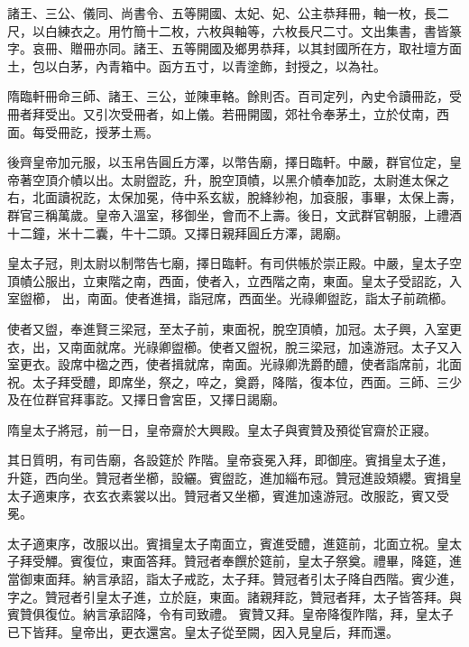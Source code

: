 \begin{pinyinscope}
 諸王、三公、儀同、尚書令、五等開國、太妃、妃、公主恭拜冊，軸一枚，長二尺，以白練衣之。用竹簡十二枚，六枚與軸等，六枚長尺二寸。文出集書，書皆篆字。哀冊、贈冊亦同。諸王、五等開國及鄉男恭拜，以其封國所在方，取社壇方面土，包以白茅，內青箱中。函方五寸，以青塗飾，封授之，以為社。



 隋臨軒冊命三師、諸王、三公，並陳車輅。餘則否。百司定列，內史令讀冊訖，受冊者拜受出。又引次受冊者，如上儀。若冊開國，郊社令奉茅土，立於仗南，西面。每受冊訖，授茅土焉。



 後齊皇帝加元服，以玉帛告圓丘方澤，以幣告廟，擇日臨軒。中嚴，群官位定，皇帝著空頂介幘以出。太尉盥訖，升，脫空頂幘，以黑介幘奉加訖，太尉進太保之右，北面讀祝訖，太保加冕，侍中系玄紱，脫絳紗袍，加袞服，事畢，太保上壽，群官三稱萬歲。皇帝入溫室，移御坐，會而不上壽。後日，文武群官朝服，上禮酒十二鐘，米十二囊，牛十二頭。又擇日親拜圓丘方澤，謁廟。



 皇太子冠，則太尉以制幣告七廟，擇日臨軒。有司供帳於崇正殿。中嚴，皇太子空頂幘公服出，立東階之南，西面，使者入，立西階之南，東面。皇太子受詔訖，入室盥櫛，
 出，南面。使者進揖，詣冠席，西面坐。光祿卿盥訖，詣太子前疏櫛。



 使者又盥，奉進賢三梁冠，至太子前，東面祝，脫空頂幘，加冠。太子興，入室更衣，出，又南面就席。光祿卿盥櫛。使者又盥祝，脫三梁冠，加遠游冠。太子又入室更衣。設席中楹之西，使者揖就席，南面。光祿卿洗爵酌醴，使者詣席前，北面祝。太子拜受醴，即席坐，祭之，啐之，奠爵，降階，復本位，西面。三師、三少及在位群官拜事訖。又擇日會宮臣，又擇日謁廟。



 隋皇太子將冠，前一日，皇帝齋於大興殿。皇太子與賓贊及預從官齋於正寢。



 其日質明，有司告廟，各設筵於
 阼階。皇帝袞冕入拜，即御座。賓揖皇太子進，升筵，西向坐。贊冠者坐櫛，設纚。賓盥訖，進加緇布冠。贊冠進設頍纓。賓揖皇太子適東序，衣玄衣素裳以出。贊冠者又坐櫛，賓進加遠游冠。改服訖，賓又受冕。



 太子適東序，改服以出。賓揖皇太子南面立，賓進受醴，進筵前，北面立祝。皇太子拜受觶。賓復位，東面答拜。贊冠者奉饌於筵前，皇太子祭奠。禮畢，降筵，進當御東面拜。納言承詔，詣太子戒訖，太子拜。贊冠者引太子降自西階。賓少進，字之。贊冠者引皇太子進，立於庭，東面。諸親拜訖，贊冠者拜，太子皆答拜。與賓贊俱復位。納言承詔降，令有司致禮。
 賓贊又拜。皇帝降復阼階，拜，皇太子已下皆拜。皇帝出，更衣還宮。皇太子從至闕，因入見皇后，拜而還。




\end{pinyinscope}

